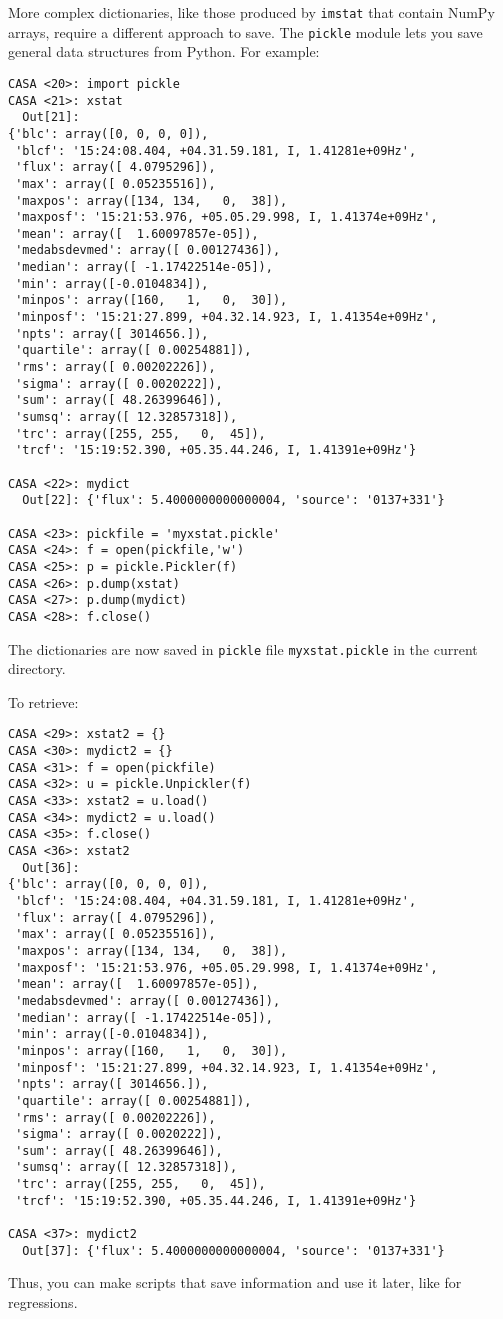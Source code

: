 More complex dictionaries, like those produced by {\tt imstat} that
contain NumPy arrays, require a different approach to save.  The
{\tt pickle} module lets you save general data structures from Python.
For example:
\small
\begin{verbatim}
CASA <20>: import pickle 
CASA <21>: xstat
  Out[21]: 
{'blc': array([0, 0, 0, 0]),
 'blcf': '15:24:08.404, +04.31.59.181, I, 1.41281e+09Hz',
 'flux': array([ 4.0795296]),
 'max': array([ 0.05235516]),
 'maxpos': array([134, 134,   0,  38]),
 'maxposf': '15:21:53.976, +05.05.29.998, I, 1.41374e+09Hz',
 'mean': array([  1.60097857e-05]),
 'medabsdevmed': array([ 0.00127436]),
 'median': array([ -1.17422514e-05]),
 'min': array([-0.0104834]),
 'minpos': array([160,   1,   0,  30]),
 'minposf': '15:21:27.899, +04.32.14.923, I, 1.41354e+09Hz',
 'npts': array([ 3014656.]),
 'quartile': array([ 0.00254881]),
 'rms': array([ 0.00202226]),
 'sigma': array([ 0.0020222]),
 'sum': array([ 48.26399646]),
 'sumsq': array([ 12.32857318]),
 'trc': array([255, 255,   0,  45]),
 'trcf': '15:19:52.390, +05.35.44.246, I, 1.41391e+09Hz'}

CASA <22>: mydict
  Out[22]: {'flux': 5.4000000000000004, 'source': '0137+331'}

CASA <23>: pickfile = 'myxstat.pickle'
CASA <24>: f = open(pickfile,'w')
CASA <25>: p = pickle.Pickler(f)
CASA <26>: p.dump(xstat)
CASA <27>: p.dump(mydict)
CASA <28>: f.close()
\end{verbatim}
\normalsize
The dictionaries are now saved in {\tt pickle} file 
{\tt myxstat.pickle} in the current directory.

To retrieve:
\small
\begin{verbatim}
CASA <29>: xstat2 = {}
CASA <30>: mydict2 = {}
CASA <31>: f = open(pickfile)
CASA <32>: u = pickle.Unpickler(f)
CASA <33>: xstat2 = u.load()
CASA <34>: mydict2 = u.load()
CASA <35>: f.close()
CASA <36>: xstat2
  Out[36]: 
{'blc': array([0, 0, 0, 0]),
 'blcf': '15:24:08.404, +04.31.59.181, I, 1.41281e+09Hz',
 'flux': array([ 4.0795296]),
 'max': array([ 0.05235516]),
 'maxpos': array([134, 134,   0,  38]),
 'maxposf': '15:21:53.976, +05.05.29.998, I, 1.41374e+09Hz',
 'mean': array([  1.60097857e-05]),
 'medabsdevmed': array([ 0.00127436]),
 'median': array([ -1.17422514e-05]),
 'min': array([-0.0104834]),
 'minpos': array([160,   1,   0,  30]),
 'minposf': '15:21:27.899, +04.32.14.923, I, 1.41354e+09Hz',
 'npts': array([ 3014656.]),
 'quartile': array([ 0.00254881]),
 'rms': array([ 0.00202226]),
 'sigma': array([ 0.0020222]),
 'sum': array([ 48.26399646]),
 'sumsq': array([ 12.32857318]),
 'trc': array([255, 255,   0,  45]),
 'trcf': '15:19:52.390, +05.35.44.246, I, 1.41391e+09Hz'}

CASA <37>: mydict2
  Out[37]: {'flux': 5.4000000000000004, 'source': '0137+331'}

\end{verbatim}
\normalsize
Thus, you can make scripts that save information and use it later,
like for regressions.

